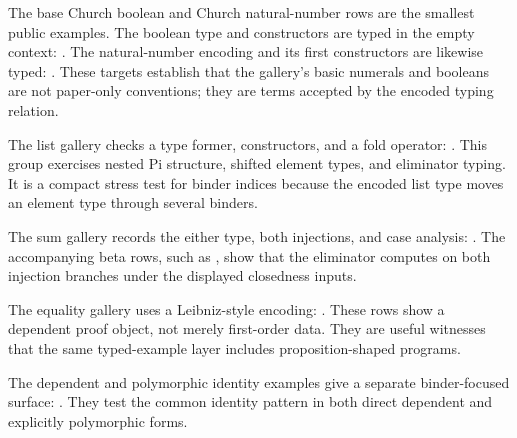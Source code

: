 The base Church boolean and Church natural-number rows are the smallest public
examples. The boolean type and constructors are typed in the empty context:
.
The natural-number encoding and its first constructors are likewise typed:
.
These targets establish that the gallery's basic numerals and booleans are not
paper-only conventions; they are terms accepted by the encoded typing relation.

The list gallery checks a type former, constructors, and a fold operator:
.
This group exercises nested Pi structure, shifted element types, and eliminator
typing. It is a compact stress test for binder indices because the encoded list
type moves an element type through several binders.

The sum gallery records the either type, both injections, and case analysis:
.
The accompanying beta rows, such as
,
show that the eliminator computes on both injection branches under the
displayed closedness inputs.

The equality gallery uses a Leibniz-style encoding:
.
These rows show a dependent proof object, not merely first-order data. They are
useful witnesses that the same typed-example layer includes proposition-shaped
programs.

The dependent and polymorphic identity examples give a separate binder-focused
surface:
.
They test the common identity pattern in both direct dependent and explicitly
polymorphic forms.

